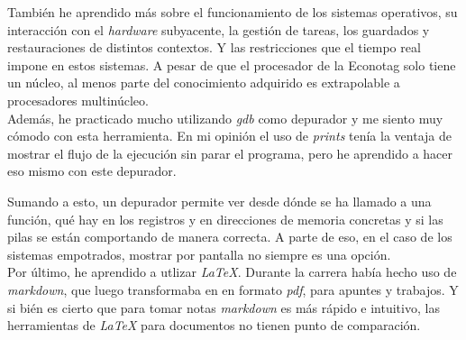 También he aprendido más sobre el funcionamiento de los sistemas operativos, su interacción con el \emph{hardware} subyacente, la gestión de tareas, los guardados y restauraciones de distintos contextos. Y las restricciones que el tiempo real impone en estos sistemas. A pesar de que el procesador de la Econotag solo tiene un núcleo, al menos parte del conocimiento adquirido es extrapolable a procesadores multinúcleo.\\

Además, he practicado mucho utilizando \emph{gdb} como depurador y me siento muy cómodo con esta herramienta. En mi opinión el uso de \emph{prints} tenía la ventaja de mostrar el flujo de la ejecución sin parar el programa, pero he aprendido a hacer eso mismo con este depurador. 

Sumando a esto, un depurador permite ver desde dónde se ha llamado a una función, qué hay en los registros y en direcciones de memoria concretas y si las pilas se están comportando de manera correcta.
A parte de eso, en el caso de los sistemas empotrados, mostrar por pantalla no siempre es una opción.\\

Por último, he aprendido a utlizar \emph{LaTeX}. Durante la carrera había hecho uso de \emph{markdown}, que luego transformaba en en formato \emph{pdf}, para apuntes y trabajos. Y si bién es cierto que para tomar notas \emph{markdown} es más rápido e intuitivo, las herramientas de \emph{LaTeX} para documentos no tienen punto de comparación.

